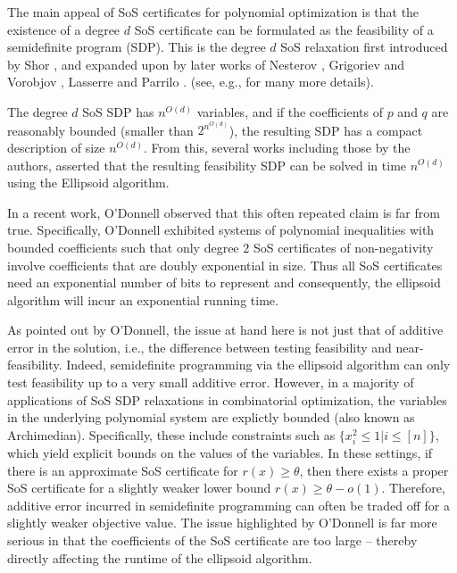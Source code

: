 The main appeal of SoS certificates for polynomial optimization is that the existence of a degree $d$ SoS certificate can be formulated as the feasibility of a semidefinite program (SDP).
%
This is the degree $d$ SoS relaxation first introduced by Shor \cite{shor1987class}, and expanded upon by later works of Nesterov \cite{nesterov2000squared}, Grigoriev and Vorobjov \cite{grigoriev2001complexity}, Lasserre \cite{lasserre2000optimisation,lasserre2001global}  and Parrilo \cite{parrilo2000structured}.
(see, e.g., \cite{laurent2009sums,} for many more details).


The degree $d$ SoS SDP has $n^{O(d)}$ variables, and if the coefficients of $p$ and $q$ are reasonably bounded (smaller than $2^{n^{O(d)}}$), the resulting SDP has a compact description of size $n^{O(d)}$.
%
From this, several works including those by the authors, asserted that the resulting feasibility SDP can be solved in time $n^{O(d)}$ using the Ellipsoid algorithm.

In a recent work, O'Donnell \cite{odonnell17} observed that this often repeated claim is far from true.
%
Specifically, O'Donnell exhibited systems of polynomial inequalities with bounded coefficients such that only degree $2$ SoS certificates of non-negativity involve coefficients that are doubly exponential in size.
%
Thus all SoS certificates need an exponential number of bits to represent and consequently, the ellipsoid algorithm will incur an exponential running time.
%
 
As pointed out by O'Donnell, the issue at hand here is not just that of additive error in the solution, i.e., the difference between testing feasibility and near-feasibility.  
%
Indeed, semidefinite programming via the ellipsoid algorithm can only test feasibility up to a very small additive error.
%
However, in a majority of applications of SoS SDP relaxations in combinatorial optimization, the variables in the underlying polynomial system are explictly bounded (also known as Archimedian).
%
Specifically, these include constraints such as $\{ x_i^2 \leq 1 | i \leq [n]\}$, which yield explicit bounds on the values of the variables.
%
In these settings, if there is an approximate SoS certificate for $r(x) \geq \theta$, then there exists a proper SoS certificate for a slightly weaker lower bound $r(x) \geq \theta - o(1)$.
%
Therefore, additive error incurred in semidefinite programming can often be traded off for a slightly weaker objective value.
%
The issue highlighted by O'Donnell is far more serious in that the coefficients of the SoS certificate are too large -- thereby directly affecting the runtime of the ellipsoid algorithm.

